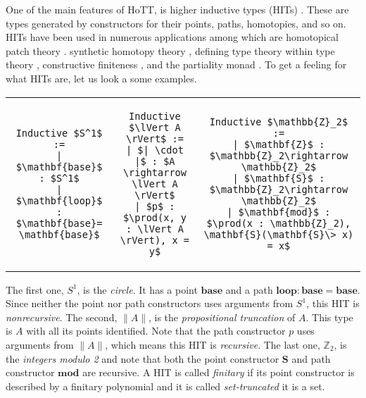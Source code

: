 \documentclass[9pt]{entcs}
\newcommand{\constructor}[1]{\mathbf{#1}}
\newcommand{\deprod}[3]{\prod(#1 : #2), #3} %
\newcommand{\0}{\textbf{0}} %
\newcommand{\trunct}[1]{\lVert #1 \rVert} %
\newcommand{\truncel}[1]{| #1 |} %
\newcommand{\Circ}{S^1} %
\newcommand{\base}{\constructor{base}} %
\newcommand{\loopS}{\constructor{loop}} %
\newcommand{\modZ}{\mathbb{Z}_2} %
\newcommand{\ZZ}{\constructor{Z}} %
\newcommand{\SZ}{\constructor{S}} %
\newcommand{\modP}{\constructor{mod}} %
\begin{document}
One of the main features of HoTT, is higher inductive types (HITs) \cite{hottbook}.
These are types generated by constructors for their points, paths, homotopies, and so on.
HITs have been used in numerous applications among which are homotopical patch theory \cite{AngiuliMLH16}. synthetic homotopy theory \cite{LicataF14,LicataS13,hottbook}, defining type theory within type theory \cite{AltenkirchK16}, constructive finiteness \cite{FruminGGW18}, and the partiality monad \cite{AltenkirchDK17}.
To get a feeling for what HITs are, let us look a some examples.

\lstset{language=Coq}
\setlength{\tabcolsep}{30pt}	
\begin{tabular}{ c c c }

\begin{lstlisting}[mathescape=true]
Inductive $\Circ$ :=
| $\base$ : $\Circ$
| $\loopS$ : $\base = \base$
\end{lstlisting}
&
\begin{lstlisting}[mathescape=true]
Inductive $\trunct{A}$ :=
| $\truncel{\cdot}$ : $A \rightarrow \trunct{A}$
| $p$ : $\deprod{x, y}{\trunct{A}}{x = y}$
\end{lstlisting}
&
\begin{lstlisting}[mathescape=true]
Inductive $\modZ$ :=
| $\ZZ$ : $\modZ \rightarrow \modZ$
| $\SZ$ : $\modZ \rightarrow \modZ$
| $\modP$ : $\deprod{x}{\modZ}{\SZ(\SZ \> x) = x}$
\end{lstlisting}
\end{tabular}

The first one, $\Circ$, is the \emph{circle}.
It has a point $\base$ and a path $\loopS : \base = \base$.
Since neither the point nor path constructors uses arguments from $\Circ$, this HIT is \emph{nonrecursive}.
The second, $\trunct{A}$, is the \emph{propositional truncation} of $A$.
This type is $A$ with all its points identified.
Note that the path constructor $p$ uses arguments from $\trunct{A}$, which means this HIT is \emph{recursive}.
The last one, $\modZ$, is the \emph{integers modulo 2} and note that both the point constructor $\SZ$ and path constructor $\modP$ are recursive.
A HIT is called \emph{finitary} if its point constructor is described by a finitary polynomial and it is called \emph{set-truncated} it is a set.
\end{document}
